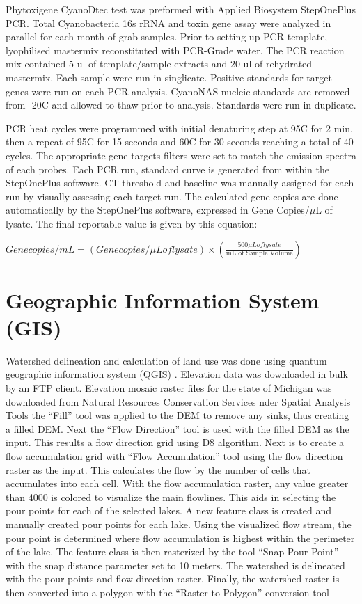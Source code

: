\documentclass{ou-thesis}
\begin{document}
Phytoxigene CyanoDtec test was preformed with Applied Biosystem StepOnePlus PCR. Total Cyanobacteria 16s rRNA and toxin gene assay were analyzed in parallel for each month of grab samples. Prior to setting up PCR template, lyophilised mastermix reconstituted with PCR-Grade water. The PCR reaction mix contained 5 ul of template/sample extracts and 20 ul of rehydrated mastermix.  Each sample were run in singlicate. Positive standards for target genes  were run on each PCR analysis. CyanoNAS nucleic standards are removed from -20C and allowed to thaw prior to analysis.  Standards were run in duplicate.

PCR heat cycles were programmed with initial denaturing step at 95C for 2 min, then a repeat of 95C for 15 seconds and 60C for 30 seconds reaching a total of 40 cycles. The appropriate gene targets filters were set to match the emission spectra of each probes. Each PCR run, standard curve is generated  from within the StepOnePlus software. CT threshold and baseline was manually assigned for each run by visually assessing each target run. The calculated gene copies are done automatically by the StepOnePlus software, expressed in Gene Copies/$\mu$L of lysate. The final reportable value is given by this equation:

\begin{center}
  $Genecopies/mL = (Genecopies/\mu L of lysate) \times (\frac{500\mu L of lysate}{\text{mL of Sample Volume}})$
\end{center}




\section{Geographic Information System (GIS)}

Watershed delineation and calculation of land use was done using quantum geographic information system (QGIS) \cite{qgis_development_team_qgis_2009}. Elevation data was downloaded in bulk by an FTP client. Elevation mosaic raster files for the state of Michigan was downloaded from Natural Resources Conservation Services
nder Spatial Analysis Tools the “Fill” tool was applied to the DEM to remove any sinks, thus creating a filled DEM. Next the “Flow Direction” tool is used with the filled DEM as the input. This results a flow direction grid using D8 algorithm. Next is to create a flow accumulation grid with “Flow Accumulation” tool using the flow direction raster as the input. This calculates the flow by the number of cells that accumulates into each cell. With the flow accumulation raster, any value greater than 4000 is colored to visualize the main flowlines. This aids in selecting the pour points for each of the selected lakes. A new feature class is created and manually created pour points for each lake. Using the visualized flow stream, the pour point is determined where flow accumulation is highest within the perimeter of the lake. The feature class is then rasterized by the tool “Snap Pour Point” with the snap distance parameter set to 10 meters. The watershed is delineated with the pour points and flow direction raster. Finally, the watershed raster is then converted into a polygon with the “Raster to Polygon” conversion tool
\end{document}
